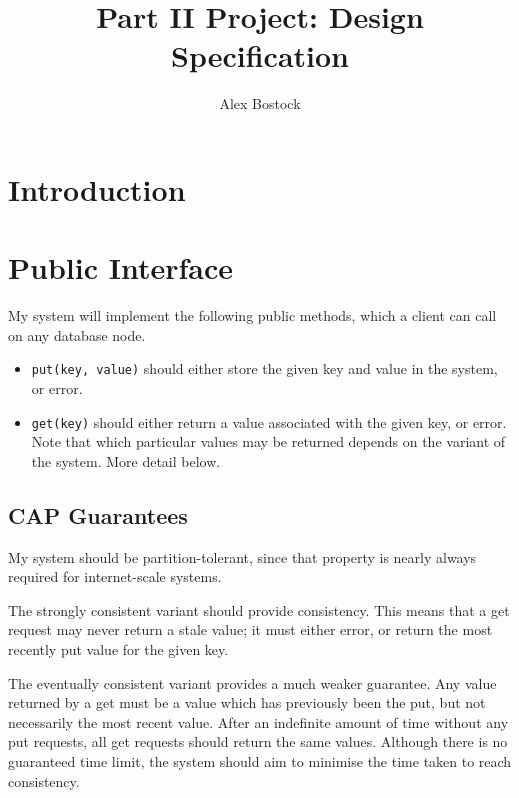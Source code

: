\documentclass[12pt,a4paper]{article}
\title{Part II Project: Design Specification}
\author{Alex Bostock}
\date{}
\begin{document}
\maketitle
\thispagestyle{fancy}

\section*{Introduction}


\section*{Public Interface}

My system will implement the following public methods, which a client can call on any database node.


\begin{itemize}
  \item
  \verb|put(key, value)| should either store the given key and value in the system, or error.

  \item
  \verb|get(key)| should either return a value associated with the given key, or error. Note that which particular values may be returned depends on the variant of the system. More detail below.

\end{itemize}


\subsection*{CAP Guarantees}

My system should be partition-tolerant, since that property is nearly always required for internet-scale systems.

The strongly consistent variant should provide consistency. This means that a get request may never return a stale value; it must either error, or return the most recently put value for the given key.

The eventually consistent variant provides a much weaker guarantee. Any value returned by a get must be a value which has previously been the put, but not necessarily the most recent value. After an indefinite amount of time without any put requests, all get requests should return the same values. Although there is no guaranteed time limit, the system should aim to minimise the time taken to reach consistency.
\end{document}
